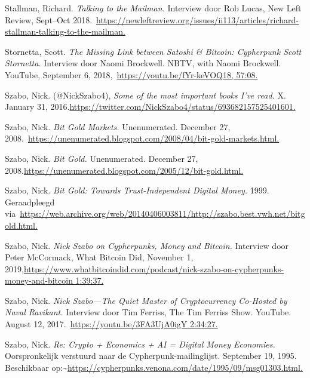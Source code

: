 \documentclass[smalldemyvopaper,11pt,twoside,onecolumn,openright,extrafontsizes,hidelinks]{memoir}
\begin{document}
Stallman, Richard. \emph{Talking to the Mailman.} Interview door Rob
Lucas, New Left Review, Sept--Oct
2018.~\href{https://newleftreview.org/issues/ii113/articles/richard-stallman-talking-to-the-mailman}{https://newleftreview.org/issues/ii113/articles/richard-stallman-talking-to-the-mailman.}

Stornetta, Scott. \emph{The Missing Link between Satoshi \& Bitcoin:
Cypherpunk Scott Stornetta.} Interview door Naomi Brockwell. NBTV, with
Naomi Brockwell. YouTube, September 6,
2018,~\href{https://youtu.be/fYr-keVOQ18,\%2057:08}{https://youtu.be/fYr-keVOQ18,
57:08.}

Szabo, Nick. (@NickSzabo4), \emph{Some of the most important books I've
read.} X. January 31,
2016.\href{https://twitter.com/NickSzabo4/status/693682157525401601}{https://twitter.com/NickSzabo4/status/693682157525401601.}

Szabo, Nick. \emph{Bit Gold Markets.} Unenumerated. December 27,
2008.~\href{https://unenumerated.blogspot.com/2008/04/bit-gold-markets.html}{https://unenumerated.blogspot.com/2008/04/bit-gold-markets.html.}

Szabo, Nick. \emph{Bit Gold.} Unenumerated. December 27,
2008.\href{https://unenumerated.blogspot.com/2005/12/bit-gold.html}{https://unenumerated.blogspot.com/2005/12/bit-gold.html.}

Szabo, Nick. \emph{Bit Gold: Towards Trust-Independent Digital Money.}
1999. Geraadpleegd
via~\href{https://web.archive.org/web/20140406003811/http:/szabo.best.vwh.net/bitgold.html}{https://web.archive.org/web/20140406003811/http://szabo.best.vwh.net/bitgold.html.}

Szabo, Nick. \emph{Nick Szabo on Cypherpunks, Money and Bitcoin.}
Interview door Peter McCormack, What Bitcoin Did, November 1,
2019,\href{https://www.whatbitcoindid.com/podcast/nick-szabo-on-cypherpunks-money-and-bitcoin\%201:39:37}{https://www.whatbitcoindid.com/podcast/nick-szabo-on-cypherpunks-money-and-bitcoin
1:39:37.}

Szabo, Nick. \emph{Nick Szabo---The Quiet Master of Cryptocurrency
\textbar{} Co-Hosted by Naval Ravikant.} Interview door Tim Ferriss, The
Tim Ferriss Show. YouTube. August 12,
2017.~\href{https://youtu.be/3FA3UjA0igY\%202:34:27}{https://youtu.be/3FA3UjA0igY
2:34:27.}

Szabo, Nick. \emph{Re: Crypto + Economics + AI = Digital Money
Economies.} Oorspronkelijk verstuurd naar de Cypherpunk-mailinglijst.
September 19, 1995. Beschikbaar
op:\textasciitilde{}\href{https://cypherpunks.venona.com/date/1995/09/msg01303.html}{https://cypherpunks.venona.com/date/1995/09/msg01303.html.}
\end{document}
